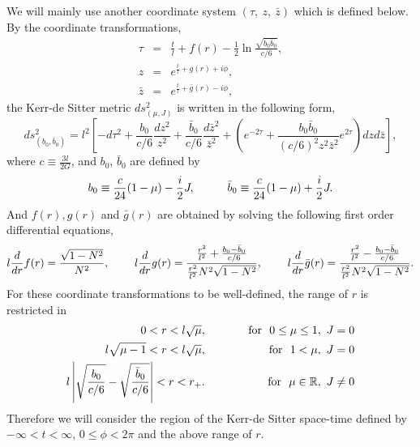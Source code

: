 \documentclass[a4paper,11pt]{article}
\begin{document}
We will mainly use another coordinate system $(\tau, \ z, \ \bar{z})$ 
which is defined below. 
By the coordinate transformations, 
\begin{eqnarray}
\label{coord-trans}
\tau&=&\frac{t}{l}+f(r)
    -\frac{1}{2}\ln\frac{\sqrt{b_0\bar{b}_0}}{c/6}, \nonumber \\ 
z&=&e^{\frac{t}{l}+g(r)+i\phi}, \\
\bar{z}&=&e^{\frac{t}{l}+\bar{g}(r)-i\phi}, \nonumber
\end{eqnarray}
the Kerr-de Sitter metric $ds^2_{(\mu, J)}$ is written 
in the following form,
\begin{equation}
\label{metric-b_0}
ds^2_{(b_0, \bar{b}_0)}=l^2\left[- d\tau^2 +\frac{b_0}{c/6}\frac{dz^2}{z^2}
                +\frac{\bar{b}_0}{c/6}\frac{d\bar{z}^2}{\bar{z}^2}
                +\left(e^{-2\tau}+\frac{b_0\bar{b}_0}{(c/6)^2 z^2 \bar{z}^2}
                  e^{2\tau}\right)dzd\bar{z} \right],
\end{equation}
where $c\equiv\frac{3l}{2G}$, and $b_0$, $\bar{b}_0$ are defined by 
\begin{equation}
\label{b_0}
b_0\equiv\frac{c}{24}(1-\mu)-\frac{i}{2}J, \hspace{10mm}
\bar{b}_0\equiv\frac{c}{24}(1-\mu)+\frac{i}{2}J.
\end{equation} 
And $f(r), g(r)$ and $\bar{g}(r)$ are obtained by solving the following 
first order differential equations, 
\begin{equation}
l\frac{d}{dr}f(r) = \frac{\sqrt{1-N^2}}{N^2}, \hspace{8mm}
l\frac{d}{dr}g(r) = \frac{\frac{r^2}{l^2}+\frac{b_0-\bar{b}_0}{c/6}}
                           {\frac{r^2}{l^2}N^2\sqrt{1-N^2}},
  \hspace{8mm}
l\frac{d}{dr}\bar{g}(r) = \frac{\frac{r^2}{l^2}-\frac{b_0-\bar{b}_0}{c/6}}
                           {\frac{r^2}{l^2}N^2\sqrt{1-N^2}}.
\end{equation}
For these coordinate transformations to be well-defined, 
the range of $r$ is restricted in
\begin{eqnarray}
0<r<l\sqrt{\mu}, && \hspace{10mm} 
    \mbox{for} \ \ 0\leq \mu \leq 1, \ J=0  \nonumber \\
l\sqrt{\mu-1}<r<l\sqrt{\mu}, && \hspace{10mm}
    \mbox{for} \ \ 1 < \mu, \ J=0 \\
l\left|\sqrt{\frac{b_0}{c/6}}-\sqrt{\frac{\bar{b}_0}{c/6}}\right|<r<r_+. 
    && \hspace{10mm} \mbox{for} \ \ \mu\in\mathbb{R}, \ J\neq 0 
     \nonumber
\end{eqnarray}
 Therefore we will consider the region of the Kerr-de Sitter 
space-time defined by $-\infty<t<\infty$, $0\leq\phi<2\pi$ 
and the above range of $r$. 
\end{document}
